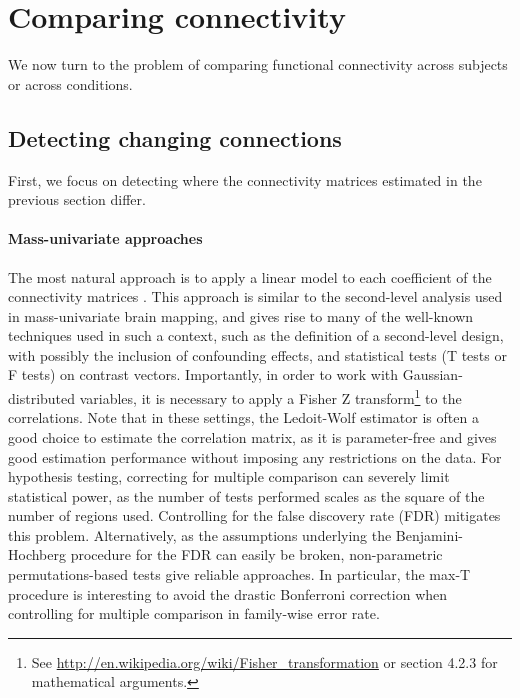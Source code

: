 \documentclass[5p]{elsarticle}
\begin{document}



\section{Comparing connectivity}

We now turn to the problem of comparing functional
connectivity across subjects or across conditions.

\subsection{Detecting changing connections}

First, we focus on detecting where the connectivity matrices estimated in
the previous section differ.

\paragraph{Mass-univariate approaches}
The most natural approach is to apply a linear model to each coefficient of
the connectivity matrices \cite{lewis2009,grillon2012}. This
approach is similar to the second-level analysis used in mass-univariate
brain mapping, and gives rise to many of the well-known techniques
used in such a context, such as the definition of a second-level design,
with possibly the inclusion of confounding effects, and statistical tests
(T tests or F tests) on contrast vectors. Importantly, in order to work
with Gaussian-distributed variables, it is necessary to apply a Fisher
Z transform\footnote{See
\url{http://en.wikipedia.org/wiki/Fisher_transformation} or
\cite{anderson1958} section 4.2.3 for mathematical arguments.} to the
correlations. Note that
in these settings, the Ledoit-Wolf estimator \cite{ledoit2004} is
often a good choice to estimate the correlation matrix, as it is
parameter-free and gives good estimation performance without imposing any
restrictions on the data.
%
For hypothesis testing,
correcting for multiple comparison can severely limit statistical
power, as the number of tests performed scales as the square of the
number of regions used. Controlling for the false discovery rate (FDR)
mitigates this problem. Alternatively, as the assumptions underlying the
Benjamini-Hochberg procedure \cite{benjamini1995} for the FDR can easily
be broken, non-parametric permutations-based tests give reliable
approaches. In particular, the max-T procedure \cite{ge2003,nichols2001}
is interesting to avoid the drastic Bonferroni correction when
controlling for multiple comparison in family-wise error rate.
\end{document}
